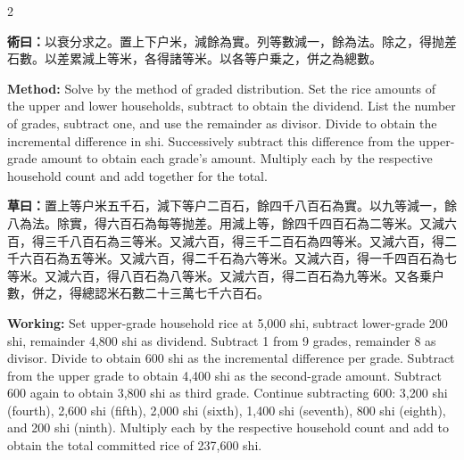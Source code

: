 \documentclass[11pt,a4paper]{article}
\newcommand{\MethodText}[1]{\par\noindent\textbf{\color{methodcolor}術曰：}#1\par}
\newcommand{\WorkingText}[1]{\par\noindent\textbf{草曰：}#1\par}
\newcommand{\MethodEn}[1]{\par\noindent\textbf{\color{methodcolor}Method:} #1\par}
\newcommand{\WorkingEn}[1]{\par\noindent\textbf{Working:} #1\par}
\begin{document}
\begin{paracol}{2}
\MethodText{以衰分求之。置上下户米，減餘為實。列等數減一，餘為法。除之，得抛差石數。以差累減上等米，各得諸等米。以各等户乗之，併之為總數。}
\switchcolumn
\MethodEn{Solve by the method of graded distribution. Set the rice amounts of the upper and lower households, subtract to obtain the dividend. List the number of grades, subtract one, and use the remainder as divisor. Divide to obtain the incremental difference in shi. Successively subtract this difference from the upper-grade amount to obtain each grade's amount. Multiply each by the respective household count and add together for the total.}
\switchcolumn*

\WorkingText{置上等户米五千石，減下等户二百石，餘四千八百石為實。以九等減一，餘八為法。除實，得六百石為每等抛差。用減上等，餘四千四百石為二等米。又減六百，得三千八百石為三等米。又減六百，得三千二百石為四等米。又減六百，得二千六百石為五等米。又減六百，得二千石為六等米。又減六百，得一千四百石為七等米。又減六百，得八百石為八等米。又減六百，得二百石為九等米。又各乗户數，併之，得總認米石數二十三萬七千六百石。}
\switchcolumn
\WorkingEn{Set upper-grade household rice at 5,000 shi, subtract lower-grade 200 shi, remainder 4,800 shi as dividend. Subtract 1 from 9 grades, remainder 8 as divisor. Divide to obtain 600 shi as the incremental difference per grade. Subtract from the upper grade to obtain 4,400 shi as the second-grade amount. Subtract 600 again to obtain 3,800 shi as third grade. Continue subtracting 600: 3,200 shi (fourth), 2,600 shi (fifth), 2,000 shi (sixth), 1,400 shi (seventh), 800 shi (eighth), and 200 shi (ninth). Multiply each by the respective household count and add to obtain the total committed rice of 237,600 shi.}

\end{paracol}
\end{document}
